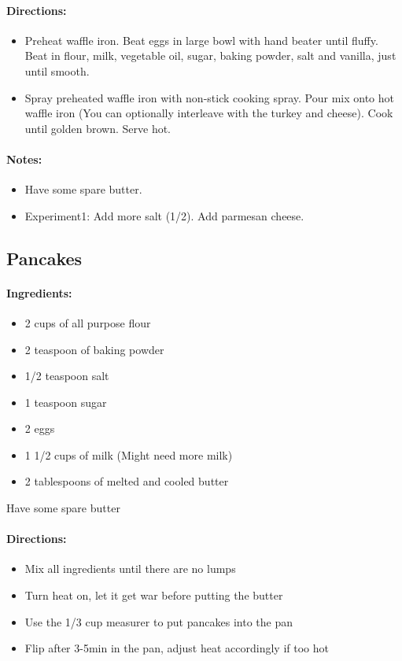 \documentclass{article}
\begin{document}
\paragraph{Directions:}
\begin{itemize}
	\item Preheat waffle iron. Beat eggs in large bowl with hand beater until fluffy. Beat in flour, milk, vegetable oil, sugar, baking powder, salt and vanilla, just until smooth.
	\item Spray preheated waffle iron with non-stick cooking spray. Pour mix onto hot waffle iron (You can optionally interleave with the turkey and cheese). Cook until golden brown. Serve hot.
\end{itemize}

\paragraph{Notes:}
\begin{itemize}
	\item Have some spare butter.
	\item Experiment1: Add more salt (1/2). Add parmesan cheese.
\end{itemize}

\subsection{Pancakes}

\paragraph{Ingredients:}

\begin{itemize}
	\item 2 cups of all purpose flour 
	\item 2 teaspoon of baking powder 
	\item 1/2 teaspoon salt 
	\item 1 teaspoon sugar 
	\item 2 eggs 
	\item 1 1/2 cups of milk (Might need more milk)
	\item 2 tablespoons of melted and cooled butter
\end{itemize}

Have some spare butter

\paragraph{Directions:}
\begin{itemize}
	\item Mix all ingredients until there are no lumps 
	\item Turn heat on, let it get war before putting the butter 
	\item Use the 1/3 cup measurer to put pancakes into the pan 
	\item Flip after 3-5min in the pan, adjust heat accordingly if too hot
\end{itemize}
\end{document}
